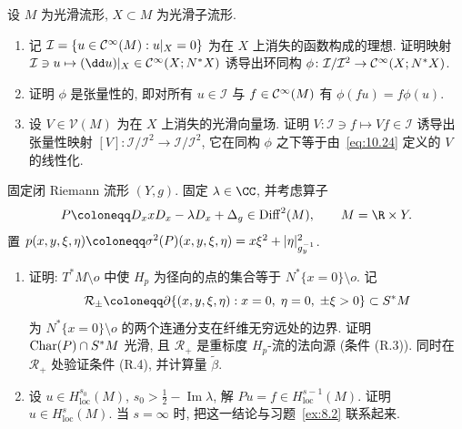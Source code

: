 \begin{exer}[线性化]\label{ex:10.5}
设 $M$ 为光滑流形, $X \subset M$ 为光滑子流形.
\begin{enumerate}
    \item 记 $\mathcal{I} = \{u \in \mathcal{C}^\infty(M) : u|_X = 0\}$ 为在 $X$ 上消失的函数构成的理想. 证明映射 $\mathcal{I} \ni u \mapsto (\dd u)|_X \in \Smooth(X; N^* X)$ 诱导出环同构 $\phi \colon \mathcal{I}/\mathcal{I}^2 \to \mathcal{C}^\infty(X; N^* X)$.
    \item 证明 $\phi$ 是张量性的, 即对所有 $u \in \mathcal{I}$ 与 $f \in \mathcal{C}^\infty(M)$ 有 $\phi(fu) = f\phi(u)$.
    \item 设 $V \in \mathcal{V}(M)$ 为在 $X$ 上消失的光滑向量场. 证明 $V \colon \mathcal{I} \ni f \mapsto V f \in \mathcal{I}$ 诱导出张量性映射 $[V] \colon \mathcal{I}/\mathcal{I}^2 \to \mathcal{I}/\mathcal{I}^2$, 它在同构 $\phi$ 之下等于由~\eqref{eq:10.24} 定义的 $V$ 的线性化.
\end{enumerate}
\end{exer}

\begin{exer}[Keldysh 算子]\label{ex:10.6}
固定闭 Riemann 流形 $(Y, g)$. 固定 $\lambda \in \CC$, 并考虑算子
\begin{equation}\label{eq:10.83}
    P \defeq D_x x D_x - \lambda D_x + \Delta_g \in \Diff^2(M), \qquad M = \R \times Y.
\end{equation}
置 $p(x, y, \xi, \eta) \defeq \sigma^2(P)(x, y, \xi, \eta) = x\xi^2 + |\eta|_{g_y^{-1}}^2$.
\begin{enumerate}
    \item 证明: $T^* M \setminus o$ 中使 $H_p$ 为径向的点的集合等于 $N^*\{x = 0\} \setminus o$. 记
    \begin{equation}\label{eq:10.84}
        \mathcal{R}_\pm \defeq \partial\{(x, y, \xi, \eta) : x = 0, \; \eta = 0, \; \pm\xi > 0\} \subset S^* M
    \end{equation}
    为 $N^*\{x = 0\} \setminus o$ 的两个连通分支在纤维无穷远处的边界. 证明 $\operatorname{Char}(P) \cap S^* M$ 光滑, 且 $\mathcal{R}_+$ 是重标度 $H_p$-流的法向源 (条件 (R.3)). 同时在 $\mathcal{R}_+$ 处验证条件 (R.4), 并计算量 $\tilde{\beta}$.
    \item 设 $u \in H_{\mathrm{loc}}^{s_0}(M)$, $s_0 > \frac{1}{2} - \operatorname{Im}\lambda$, 解 $P u = f \in H_{\mathrm{loc}}^{s-1}(M)$. 证明 $u \in H_{\mathrm{loc}}^{s}(M)$. 当 $s = \infty$ 时, 把这一结论与习题~\ref{ex:8.2} 联系起来.
\end{enumerate}
\end{exer}

